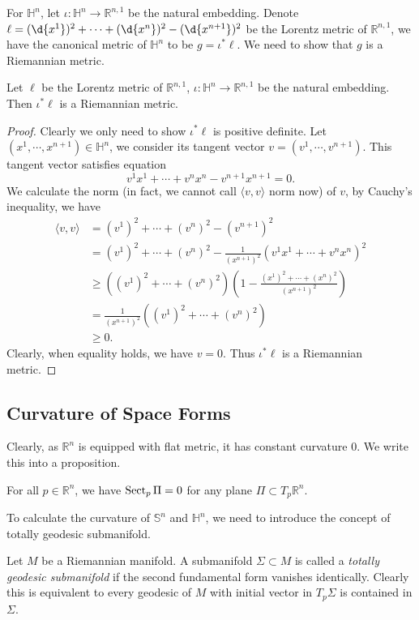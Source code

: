 For $\mathbb{H}^n$, let $\iota:\mathbb{H}^n\to\mathbb{R}^{n,1}$ be the natural embedding.
Denote $\ell=(\d{x^1})^2+\cdots+(\d{x^n})^2-(\d{x^{n+1}})^2$ be the Lorentz metric of $\mathbb{R}^{n,1}$, we have the canonical metric of $\mathbb{H}^n$ to be $g=\iota^*\ell$.
We need to show that $g$ is a Riemannian metric.
\begin{lem}
    Let $\ell$ be the Lorentz metric of $\mathbb{R}^{n,1}$, $\iota:\mathbb{H}^n\to\mathbb{R}^{n,1}$ be the natural embedding.
    Then $\iota^*\ell$ is a Riemannian metric.
\end{lem}
\begin{proof}
    Clearly we only need to show $\iota^*\ell$ is positive definite.
    Let $(x^1,\cdots,x^{n+1})\in\mathbb{H}^n$, we consider its tangent vector $v=(v^1,\cdots,v^{n+1})$.
    This tangent vector satisfies equation
    \[v^1x^1+\cdots+v^nx^n-v^{n+1}x^{n+1}=0.\]
    We calculate the norm (in fact, we cannot call $\langle v,v\rangle$ norm now) of $v$, by Cauchy's inequality, we have
    \begin{align*}
        \langle v,v\rangle&=(v^1)^2+\cdots+(v^n)^2-(v^{n+1})^2\\
        &=(v^1)^2+\cdots+(v^n)^2-\frac{1}{(x^{n+1})^2}(v^1x^1+\cdots+v^nx^n)^2\\
        &\geq((v^1)^2+\cdots+(v^n)^2)\left(1-\frac{(x^1)^2+\cdots+(x^n)^2}{(x^{n+1})^2}\right)\\
        &=\frac{1}{(x^{n+1})^2}((v^1)^2+\cdots+(v^n)^2)\\
        &\geq 0.
    \end{align*}
    Clearly, when equality holds, we have $v=0$.
    Thus $\iota^*\ell$ is a Riemannian metric.
\end{proof}

\subsection*{Curvature of Space Forms}

Clearly, as $\mathbb{R}^n$ is equipped with flat metric, it has constant curvature $0$.
We write this into a proposition.
\begin{prop}
    For all $p\in\mathbb{R}^n$, we have $\operatorname{Sect}_p{\Pi}=0$ for any plane $\Pi\subset T_p\mathbb{R}^n$.
\end{prop}

To calculate the curvature of $\mathbb{S}^n$ and $\mathbb{H}^n$, we need to introduce the concept of totally geodesic submanifold.

\begin{defn}
    Let $M$ be a Riemannian manifold.
    A submanifold $\Sigma\subset M$ is called a \emph{totally geodesic submanifold} if the second fundamental form vanishes identically.
    Clearly this is equivalent to every geodesic of $M$ with initial vector in $T_p\Sigma$ is contained in $\Sigma$.
\end{defn}

